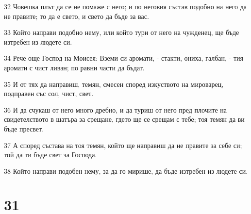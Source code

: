 \par 32 Човешка плът да се не помаже с него; и по неговия състав подобно на него да не правите; то да е свето, и свето да бъде за вас.
\par 33 Който направи подобно нему, или който тури от него на чужденец, ще бъде изтребен из людете си.
\par 34 Рече още Господ на Моисея: Вземи си аромати, - стакти, ониха, галбан, - тия аромати с чист ливан; по равни части да бъдат.
\par 35 И от тях да направиш, темян, смесен според изкуството на мироварец, подправен със сол, чист, свет.
\par 36 И да счукаш от него много дребно, и да туриш от него пред плочите на свидетелството в шатъра за срещане, гдето ще се срещам с тебе; тоя темян да ви бъде пресвет.
\par 37 А според състава на тоя темян, който ще направиш да не правите за себе си; той да ти бъде свет за Господа.
\par 38 Който направи подобен нему, за да го мирише, да бъде изтребен из людете си.

\chapter{31}

